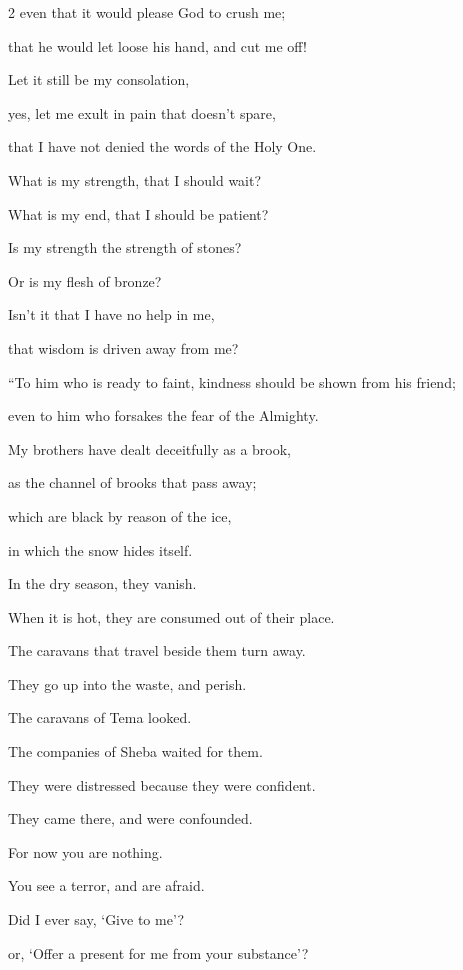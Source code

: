 \begin{multicols}{2}
	\myverse{}even that it would please God to crush me;
	
	that he would let loose his hand, and cut me off!
	
	\myverse{}Let it still be my consolation,
	
	yes, let me exult in pain that doesn’t spare,
	
	that I have not denied the words of the Holy One.
	
	\myverse{}What is my strength, that I should wait?
	
	What is my end, that I should be patient?
	
	\myverse{}Is my strength the strength of stones?
	
	Or is my flesh of bronze?
	
	\myverse{}Isn’t it that I have no help in me,
	
	that wisdom is driven away from me?
	
	\vspace{\baselineskip}
	
	\myverse{}“To him who is ready to faint, kindness should be shown from
	his friend;
	
	even to him who forsakes the fear of the Almighty.
	
	\myverse{}My brothers have dealt deceitfully as a brook,
	
	as the channel of brooks that pass away;
	
	\myverse{}which are black by reason of the ice,
	
	in which the snow hides itself.
	
	\myverse{}In the dry season, they vanish.
	
	When it is hot, they are consumed out of their place.
	
	\myverse{}The caravans that travel beside them turn away.
	
	They go up into the waste, and perish.
	
	\myverse{}The caravans of Tema looked.
	
	The companies of Sheba waited for them.
	
	\myverse{}They were distressed because they were confident.
	
	They came there, and were confounded.
	
	\myverse{}For now you are nothing.
	
	You see a terror, and are afraid.
	
	\myverse{}Did I ever say, ‘Give to me’?
	
	or, ‘Offer a present for me from your substance’?
	

\end{multicols}
